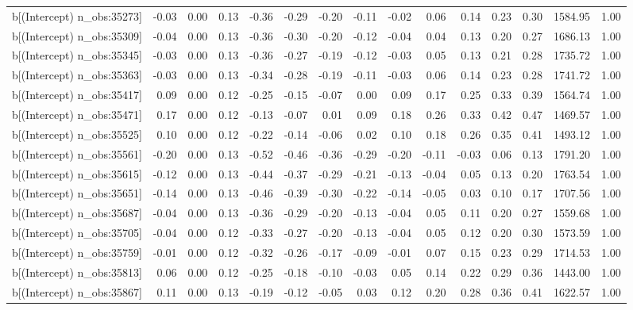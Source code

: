 \begin{table}[ht]
\begin{tabular}{rrrrrrrrrrrrrrr}
  b[(Intercept) n\_obs:35273] & -0.03 & 0.00 & 0.13 & -0.36 & -0.29 & -0.20 & -0.11 & -0.02 & 0.06 & 0.14 & 0.23 & 0.30 & 1584.95 & 1.00 \\ 
  b[(Intercept) n\_obs:35309] & -0.04 & 0.00 & 0.13 & -0.36 & -0.30 & -0.20 & -0.12 & -0.04 & 0.04 & 0.13 & 0.20 & 0.27 & 1686.13 & 1.00 \\ 
  b[(Intercept) n\_obs:35345] & -0.03 & 0.00 & 0.13 & -0.36 & -0.27 & -0.19 & -0.12 & -0.03 & 0.05 & 0.13 & 0.21 & 0.28 & 1735.72 & 1.00 \\ 
  b[(Intercept) n\_obs:35363] & -0.03 & 0.00 & 0.13 & -0.34 & -0.28 & -0.19 & -0.11 & -0.03 & 0.06 & 0.14 & 0.23 & 0.28 & 1741.72 & 1.00 \\ 
  b[(Intercept) n\_obs:35417] & 0.09 & 0.00 & 0.12 & -0.25 & -0.15 & -0.07 & 0.00 & 0.09 & 0.17 & 0.25 & 0.33 & 0.39 & 1564.74 & 1.00 \\ 
  b[(Intercept) n\_obs:35471] & 0.17 & 0.00 & 0.12 & -0.13 & -0.07 & 0.01 & 0.09 & 0.18 & 0.26 & 0.33 & 0.42 & 0.47 & 1469.57 & 1.00 \\ 
  b[(Intercept) n\_obs:35525] & 0.10 & 0.00 & 0.12 & -0.22 & -0.14 & -0.06 & 0.02 & 0.10 & 0.18 & 0.26 & 0.35 & 0.41 & 1493.12 & 1.00 \\ 
  b[(Intercept) n\_obs:35561] & -0.20 & 0.00 & 0.13 & -0.52 & -0.46 & -0.36 & -0.29 & -0.20 & -0.11 & -0.03 & 0.06 & 0.13 & 1791.20 & 1.00 \\ 
  b[(Intercept) n\_obs:35615] & -0.12 & 0.00 & 0.13 & -0.44 & -0.37 & -0.29 & -0.21 & -0.13 & -0.04 & 0.05 & 0.13 & 0.20 & 1763.54 & 1.00 \\ 
  b[(Intercept) n\_obs:35651] & -0.14 & 0.00 & 0.13 & -0.46 & -0.39 & -0.30 & -0.22 & -0.14 & -0.05 & 0.03 & 0.10 & 0.17 & 1707.56 & 1.00 \\ 
  b[(Intercept) n\_obs:35687] & -0.04 & 0.00 & 0.13 & -0.36 & -0.29 & -0.20 & -0.13 & -0.04 & 0.05 & 0.11 & 0.20 & 0.27 & 1559.68 & 1.00 \\ 
  b[(Intercept) n\_obs:35705] & -0.04 & 0.00 & 0.12 & -0.33 & -0.27 & -0.20 & -0.13 & -0.04 & 0.05 & 0.12 & 0.20 & 0.30 & 1573.59 & 1.00 \\ 
  b[(Intercept) n\_obs:35759] & -0.01 & 0.00 & 0.12 & -0.32 & -0.26 & -0.17 & -0.09 & -0.01 & 0.07 & 0.15 & 0.23 & 0.29 & 1714.53 & 1.00 \\ 
  b[(Intercept) n\_obs:35813] & 0.06 & 0.00 & 0.12 & -0.25 & -0.18 & -0.10 & -0.03 & 0.05 & 0.14 & 0.22 & 0.29 & 0.36 & 1443.00 & 1.00 \\ 
  b[(Intercept) n\_obs:35867] & 0.11 & 0.00 & 0.13 & -0.19 & -0.12 & -0.05 & 0.03 & 0.12 & 0.20 & 0.28 & 0.36 & 0.41 & 1622.57 & 1.00 \\ 

\end{tabular}
\end{table}
